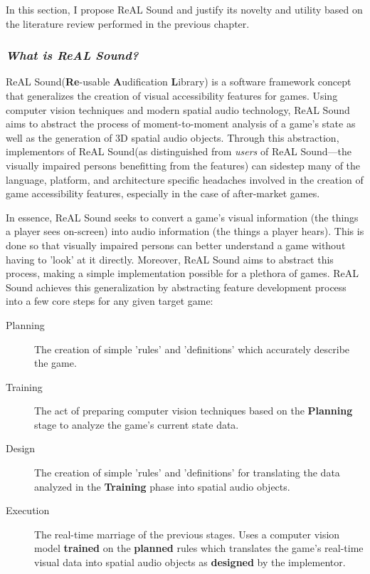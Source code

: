 \documentclass{report}
\newcommand{\rs}{ReAL Sound\xspace}
\newcommand{\rsfull}{\textbf{Re}-usable \textbf{A}udification \textbf{L}ibrary\xspace}
\begin{document}
In this section, I propose \rs and justify its novelty and utility based on the literature review performed in the previous chapter.

\subsubsection{\emph{What is \rs?}}
\rs (\rsfull) is a software framework concept that generalizes the creation of visual accessibility features for games. Using computer vision techniques and modern spatial audio technology, \rs aims to abstract the process of moment-to-moment analysis of a game's state as well as the generation of 3D spatial audio objects. Through this abstraction, implementors of \rs (as distinguished from \emph{users} of \rs---the visually impaired persons benefitting from the features) can sidestep many of the language, platform, and architecture specific headaches involved in the creation of game accessibility features, especially in the case of after-market games. 

In essence, \rs seeks to convert a game's visual information (the things a player sees on-screen) into audio information (the things a player hears). This is done so that visually impaired persons can better understand a game without having to 'look' at it directly. Moreover, \rs aims to abstract this process, making a simple implementation possible for a plethora of games. \rs achieves this generalization by abstracting feature development process into a few core steps for any given target game:

\begin{description}
    \item [Planning] The creation of simple 'rules' and 'definitions' which accurately describe the game.
    \item [Training] The act of preparing computer vision techniques based on the \textbf{Planning} stage to analyze the game's current state data.
    \item [Design] The creation of simple 'rules' and 'definitions' for translating the data analyzed in the \textbf{Training} phase into spatial audio objects. 
    \item [Execution] The real-time marriage of the previous stages. Uses a computer vision model \textbf{trained} on the \textbf{planned} rules which translates the game's real-time visual data into spatial audio objects as \textbf{designed} by the implementor.    
\end{description}
\end{document}
